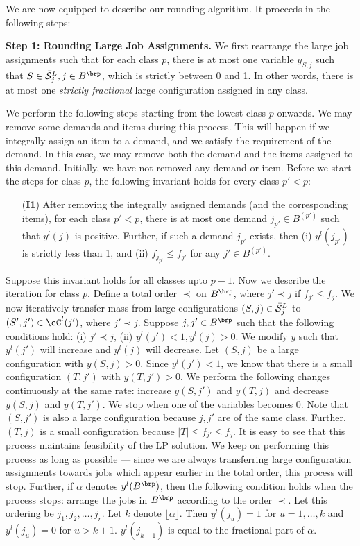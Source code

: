 \medskip \noindent We are now equipped to describe our rounding algorithm. It proceeds in the following steps:



\medskip \noindent
{\bf Step 1: Rounding Large Job Assignments.} We first rearrange the large job assignments such that for each class $p$, there is at most one variable $y_{S,j}$ such that $S \in \barcalS^L_j, j \in B^\brp$, which is strictly between 0 and 1. In other words, there is at most one \emph{strictly fractional} large configuration assigned in any class.

We perform the following steps starting from the lowest class $p$ onwards.
We may remove some demands and items during this process. This will happen if we integrally assign an item to a demand, and we satisfy the requirement of the demand. In this case, we may remove both the demand and the items assigned to this demand. Initially, we have  not removed any demand or
item. Before we start the steps for class $p$, the following invariant holds for every class $p' < p$:

\begin{itemize}
\item[({\bf I1})] After removing the integrally assigned demands (and the corresponding items), for each class $p' < p$, there is at most one  demand $j_{p'} \in B^{(p')}$ such that $y^l(j)$ is positive. Further, if such a demand $j_{p'}$ exists, then (i) $y^l(j_{p'})$ is strictly less than 1, and
(ii) $f_{j_{p'}} \leq f_{j'}$ for any $j' \in B^{(p')}$.
\end{itemize}

Suppose this invariant holds for all classes upto $p-1$. Now we describe the iteration for class $p$.
Define a total order $\prec$ on $B^\brp$, where $j' \prec j$ if $f_{j'} \leq f_{j}$.  We now iteratively transfer mass from large configurations $(S,j) \in \bar{\cal S}^L_j$ to $(S',j') \in \cC^l(j')$, where $j' \prec j$. Suppose $j,j' \in B^\brp$ such that the following conditions hold: (i) $j' \prec j$, (ii) $y^l(j') < 1, y^l(j) > 0$. We modify $y$ such that
$y^l(j')$ will increase and $y^l(j)$ will decrease. Let $(S,j)$ be a large configuration with $y(S,j) > 0$. Since $y^l(j') < 1$, we know that there is a small configuration $(T,j')$ with $y(T,j') > 0$. We perform the following changes continuously at the same rate: increase $y(S,j')$ and $y(T,j)$ and decrease $y(S,j)$ and $y(T,j')$. We stop when one of the variables becomes 0. Note that $(S,j')$ is also a large configuration because $j,j'$ are of the same class. Further, $(T,j)$ is a small configuration because $|T| \leq f_{j'} \leq f_j$. It is easy to see that this process maintains feasibility of the LP solution. We keep on performing this process as long as possible --- since we are always transferring large configuration assignments towards jobs which appear earlier in the total order, this process will stop. Further, if $\alpha$ denotes $y^l(B^\brp)$, then the following condition holds when the process stops: arrange the jobs in $B^\brp$ according to the order $\prec$. Let this ordering be $j_1, j_2, \ldots, j_r$. Let $k$ denote $\lfloor \alpha \rfloor$. Then $y^l(j_u) = 1$ for $u=1, \ldots, k$ and $y^l(j_u) = 0$ for $u > k+1$. $y^l(j_{k+1})$ is equal to the fractional part of $\alpha$.


